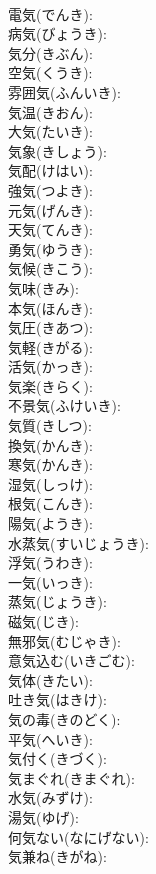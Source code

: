 \documentclass[8pt]{extreport}
\begin{document}
\begin{CJK}{UTF8}{min}
\\	電気(でんき): 
\\	病気(びょうき): 
\\	気分(きぶん): 
\\	空気(くうき): 
\\	雰囲気(ふんいき): 
\\	気温(きおん): 
\\	大気(たいき): 
\\	気象(きしょう): 
\\	気配(けはい): 
\\	強気(つよき): 
\\	元気(げんき): 
\\	天気(てんき): 
\\	勇気(ゆうき): 
\\	気候(きこう): 
\\	気味(きみ): 
\\	本気(ほんき): 
\\	気圧(きあつ): 
\\	気軽(きがる): 
\\	活気(かっき): 
\\	気楽(きらく): 
\\	不景気(ふけいき): 
\\	気質(きしつ): 
\\	換気(かんき): 
\\	寒気(かんき): 
\\	湿気(しっけ): 
\\	根気(こんき): 
\\	陽気(ようき): 
\\	水蒸気(すいじょうき): 
\\	浮気(うわき): 
\\	一気(いっき): 
\\	蒸気(じょうき): 
\\	磁気(じき): 
\\	無邪気(むじゃき): 
\\	意気込む(いきごむ): 
\\	気体(きたい): 
\\	吐き気(はきけ): 
\\	気の毒(きのどく): 
\\	平気(へいき): 
\\	気付く(きづく): 
\\	気まぐれ(きまぐれ): 
\\	水気(みずけ): 
\\	湯気(ゆげ): 
\\	何気ない(なにげない): 
\\	気兼ね(きがね): 

\end{CJK}
\end{document}
